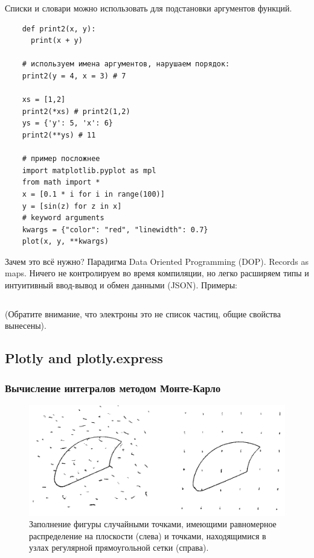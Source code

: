 \documentclass{book}
\begin{document}
Списки и словари можно использовать для подстановки аргументов функций.
\begin{verbatim}
    def print2(x, y):
      print(x + y)
 
    # используем имена аргументов, нарушаем порядок:
    print2(y = 4, x = 3) # 7
 
    xs = [1,2]
    print2(*xs) # print2(1,2)
    ys = {'y': 5, 'x': 6}
    print2(**ys) # 11
 
    # пример посложнее
    import matplotlib.pyplot as mpl
    from math import *
    x = [0.1 * i for i in range(100)]
    y = [sin(z) for z in x]
    # keyword arguments
    kwargs = {"color": "red", "linewidth": 0.7}
    plot(x, y, **kwargs)
\end{verbatim}

Зачем это всё нужно? Парадигма Data Oriented Programming (DOP). Records as maps. Ничего не контролируем во время компиляции, но
легко расширяем типы и интуитивный ввод-вывод и обмен данными (JSON). Примеры:
\inputminted{python}{romanNumbers.py}

(Обратите внимание, что электроны это не список частиц, общие свойства вынесены).

\subsection{Plotly and plotly.express}

\subsubsection{Вычисление интегралов методом Монте-Карло}

\begin{figure}
	\includegraphics[width=1\linewidth]{dots-for-monte-carlo.png}
    \caption{\label{dots-for-monte-carlo}Заполнение фигуры случайными точками, имеющими равномерное
    распределение на плоскости (слева) и точками, находящимися в узлах регулярной прямоугольной
    сетки (справа).}
\end{figure}
\end{document}
